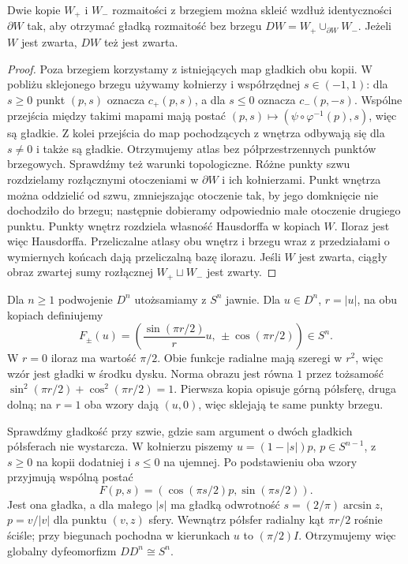 \begin{wniosek}
\label{cor:podwojenie-15}
Dwie kopie $W_+$ i $W_-$ rozmaitości
z brzegiem można skleić wzdłuż
identyczności $\partial W$ tak,
aby otrzymać gładką rozmaitość
bez brzegu
$DW=W_+\cup_{\partial W}W_-$.
Jeżeli $W$ jest zwarta, $DW$
też jest zwarta.
\end{wniosek}
\begin{proof}
Poza brzegiem korzystamy z
istniejących map gładkich obu kopii.
W pobliżu sklejonego brzegu
używamy kołnierzy i współrzędnej
$s\in(-1,1)$: dla $s\geq0$
punkt $(p,s)$ oznacza $c_+(p,s)$,
a dla $s\leq0$ oznacza
$c_-(p,-s)$. Wspólne przejścia
między takimi mapami mają postać
$(p,s)\mapsto(\psi\circ\varphi^{-1}(p),s)$,
więc są gładkie. Z kolei przejścia
do map pochodzących z wnętrza
odbywają się dla $s\ne0$ i także
są gładkie. Otrzymujemy atlas
bez półprzestrzennych punktów
brzegowych. Sprawdźmy też warunki topologiczne.
Różne punkty szwu rozdzielamy rozłącznymi otoczeniami
w $\partial W$ i ich kołnierzami. Punkt wnętrza
można oddzielić od szwu, zmniejszając otoczenie
tak, by jego domknięcie nie dochodziło do brzegu;
następnie dobieramy odpowiednio małe otoczenie
drugiego punktu. Punkty wnętrz rozdziela własność
Hausdorffa w kopiach $W$. Iloraz jest więc Hausdorffa.
Przeliczalne atlasy obu wnętrz i brzegu wraz
z przedziałami o wymiernych końcach dają przeliczalną
bazę ilorazu. Jeśli $W$ jest zwarta, ciągły obraz
zwartej sumy rozłącznej $W_+\sqcup W_-$ jest zwarty.
\end{proof}

\begin{przyklad}
\label{prz:podwojenie-dysku-20}
Dla $n\geq1$ podwojenie $D^n$ utożsamiamy z $S^n$ jawnie.
Dla $u\in D^n$, $r=|u|$, na obu kopiach definiujemy
\[
 F_\pm(u)=
 \left(\frac{\sin(\pi r/2)}{r}u,\,
             \pm\cos(\pi r/2)\right)\in S^n.
\]
W $r=0$ iloraz ma wartość $\pi/2$.
Obie funkcje radialne mają szeregi w $r^2$,
więc wzór jest gładki w środku dysku.
Norma obrazu jest równa $1$ przez tożsamość
$\sin^2(\pi r/2)+\cos^2(\pi r/2)=1$.
Pierwsza kopia opisuje górną półsferę, druga dolną;
na $r=1$ oba wzory dają $(u,0)$, więc sklejają te same
punkty brzegu.

Sprawdźmy gładkość przy szwie, gdzie sam argument o dwóch
gładkich półsferach nie wystarcza.
W kołnierzu piszemy $u=(1-|s|)p$, $p\in S^{n-1}$,
z $s\geq0$ na kopii dodatniej i $s\leq0$ na ujemnej.
Po podstawieniu oba wzory przyjmują wspólną postać
\[
 F(p,s)=(\cos(\pi s/2)p,\sin(\pi s/2)).
\]
Jest ona gładka, a dla małego $|s|$ ma gładką odwrotność
$s=(2/\pi)\arcsin z$, $p=v/|v|$ dla punktu $(v,z)$ sfery.
Wewnątrz półsfer radialny kąt $\pi r/2$ rośnie ściśle;
przy biegunach pochodna w kierunkach $u$ to $(\pi/2)I$.
Otrzymujemy więc globalny dyfeomorfizm $DD^n\cong S^n$.
\end{przyklad}

